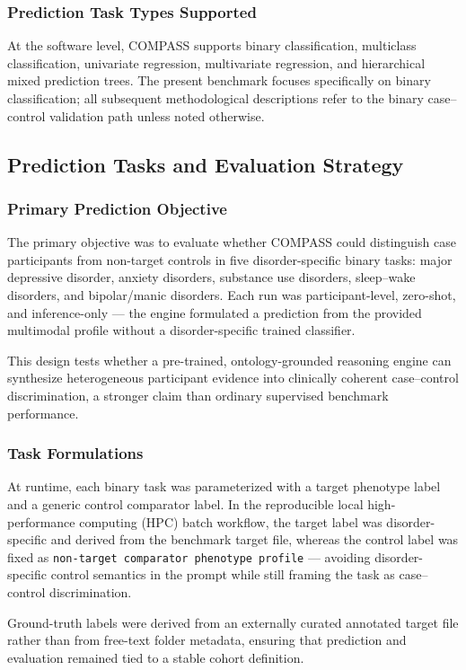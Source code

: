 \documentclass[11pt,a4paper,twoside]{article}
\begin{document}
\subsubsection{Prediction Task Types Supported}
At the software level, COMPASS supports binary classification, multiclass classification, univariate regression, multivariate regression, and hierarchical mixed prediction trees. The present benchmark focuses specifically on binary classification; all subsequent methodological descriptions refer to the binary case--control validation path unless noted otherwise.

\subsection{Prediction Tasks and Evaluation Strategy}
\subsubsection{Primary Prediction Objective}
The primary objective was to evaluate whether COMPASS could distinguish case participants from non-target controls in five disorder-specific binary tasks: major depressive disorder, anxiety disorders, substance use disorders, sleep--wake disorders, and bipolar/manic disorders. Each run was participant-level, zero-shot, and inference-only --- the engine formulated a prediction from the provided multimodal profile without a disorder-specific trained classifier.

This design tests whether a pre-trained, ontology-grounded reasoning engine can synthesize heterogeneous participant evidence into clinically coherent case--control discrimination, a stronger claim than ordinary supervised benchmark performance.

\subsubsection{Task Formulations}
At runtime, each binary task was parameterized with a target phenotype label and a generic control comparator label. In the reproducible local high-performance computing (HPC) batch workflow, the target label was disorder-specific and derived from the benchmark target file, whereas the control label was fixed as \texttt{non-target comparator phenotype profile} --- avoiding disorder-specific control semantics in the prompt while still framing the task as case--control discrimination.

Ground-truth labels were derived from an externally curated annotated target file rather than from free-text folder metadata, ensuring that prediction and evaluation remained tied to a stable cohort definition.
\end{document}
